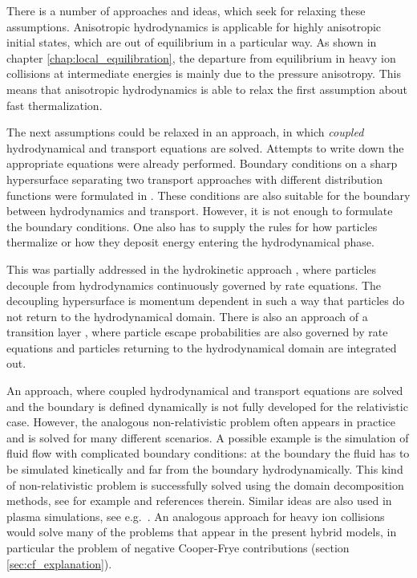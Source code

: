 There is a number of approaches and ideas, which seek for relaxing these
assumptions. Anisotropic hydrodynamics \cite{Strickland:2014pga,Bazow:2013ifa}
is applicable for highly anisotropic initial states, which are out of equilibrium
in a particular way. As shown in chapter \ref{chap:local_equilibration}, the
departure from equilibrium in heavy ion collisions at intermediate energies is mainly
due to the pressure anisotropy. This means that anisotropic hydrodynamics is able to
relax the first assumption about fast thermalization.

The next assumptions could be relaxed in an approach, in which \emph{coupled}
hydrodynamical and transport equations are solved. Attempts to
write down the appropriate equations were already performed. Boundary conditions on
a sharp hypersurface separating two transport approaches with different
distribution functions were formulated in \cite{Bugaev:2002ch}. These conditions
are also suitable for the boundary between hydrodynamics and transport. However, it is not
enough to formulate the boundary conditions. One also has to supply the rules for
how particles thermalize or how they deposit energy entering the hydrodynamical
phase.

This was partially addressed in the hydrokinetic approach
\cite{Sinyukov:2002if,Akkelin:2008eh}, where particles decouple from
hydrodynamics continuously governed by rate equations. The decoupling
hypersurface is momentum dependent in such a way that particles do not
return to the hydrodynamical domain. There is also an approach of a transition
layer \cite{Csernai:2004pr,Molnar:2005gx}, where particle escape probabilities
are also governed by rate equations and particles returning to the hydrodynamical
domain are integrated out.

An approach, where coupled hydrodynamical and transport equations are solved and the
boundary is defined dynamically is not fully developed for the relativistic case.
However, the analogous non-relativistic problem often appears in practice and is solved
for many different scenarios. A possible example is the simulation
of fluid flow with complicated boundary conditions: at the boundary the fluid has
to be simulated kinetically and far from the boundary hydrodynamically.
This kind of non-relativistic problem is successfully solved using
the domain decomposition methods, see for example \cite{Tiwari:2009} and references
therein. Similar ideas are also used in plasma simulations, see
e.g.~\cite{Tuckmantel:2010}. An analogous approach for heavy ion collisions
would solve many of the problems that appear in the present hybrid models,
in particular the problem of negative Cooper-Frye contributions (section
\ref{sec:cf_explanation}).

